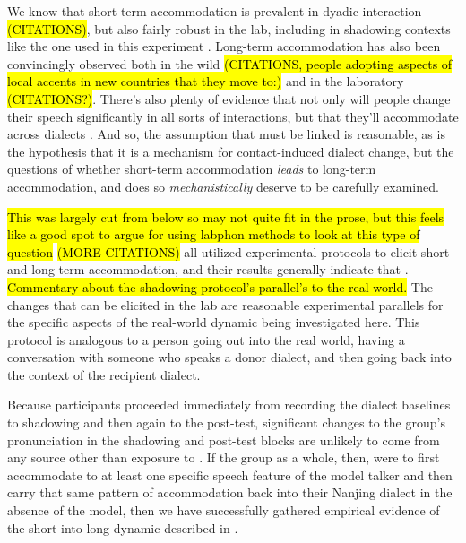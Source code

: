    We know that short-term accommodation is prevalent in dyadic interaction \IRL{} \hl{(CITATIONS)}, but also fairly robust in the lab, including in shadowing contexts like the one used in this experiment \citep{nielsen2008word,pardo2006phonetic,zellou2016phonetic}. Long-term accommodation has also been convincingly observed both in the wild \hl{(CITATIONS, people adopting aspects of local accents in new countries that they move to:)}\citep{chambers1992dialect, kerswill2000creating} and in the laboratory \hl{(CITATIONS?)}. There's also plenty of evidence that not only will people change their speech significantly in all sorts of interactions, but that they'll accommodate across dialects \citep{delvaux2007influence,babel2010dialect,clopper2014sound}. And so, the assumption that \sla{} must be linked is reasonable, as is the hypothesis that it is a mechanism for contact-induced dialect change, but the questions of whether short-term accommodation \emph{leads} to long-term accommodation, and does so \emph{mechanistically} deserve to be carefully examined. 
    
    \hl{This was largely cut from below so may not quite fit in the prose, but this feels like a good spot to argue for using labphon methods to look at this type of question} \cite{delvaux2007influence} \hl{(MORE CITATIONS)} all utilized experimental protocols to elicit short and long-term accommodation, and their results generally indicate that \xxxxx{}. \hl{Commentary about the shadowing protocol's parallel's to the real world.} The changes that can be elicited in the lab are reasonable experimental parallels for the specific aspects of the real-world \sla{} dynamic being investigated here. This protocol is analogous to a person going out into the real world, having a conversation with someone who speaks a donor dialect, and then going back into the context of the recipient dialect.
    
    Because participants proceeded immediately from recording the dialect baselines to shadowing \annie{} and then again to the \ND{} post-test, significant changes to the group's pronunciation in the shadowing and post-test blocks are unlikely to come from any source other than exposure to \annie{}. %
    If the group as a whole, then, were to first accommodate to at least one specific speech feature of the model talker and then carry that same pattern of accommodation back into their Nanjing dialect in the absence of the model, then we have successfully gathered empirical evidence of the short-into-long dynamic described in \cbat{}.
    
